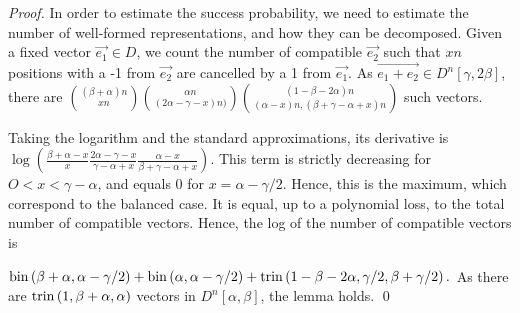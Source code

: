 \begin{proof}
In order to estimate the success probability, we need to estimate the number of well-formed representations, and how they can be decomposed. Given a fixed vector $\vec{e_1} \in D$, we count the number of compatible $\vec{e_2}$ such that $xn$ positions with a -1 from $\vec{e_2}$ are cancelled by a 1 from $\vec{e_1}$. As $\vec{e_1+e_2} \in D^n[\gamma,2\beta]$, there are
${(\beta+\alpha)n \choose xn} {\alpha n \choose (2\alpha - \gamma -x) n)} { (1-\beta-2\alpha)n \choose (\alpha-x)n, (\beta+\gamma-\alpha+x)n }$ such vectors.

Taking the logarithm and the standard approximations, its derivative is $\log\left(\frac{\beta + \alpha -x}x \frac{2\alpha-\gamma -x}{\gamma-\alpha+x} \frac{\alpha-x}{\beta+\gamma-\alpha+x}\right)$. This term is strictly decreasing for $O< x < \gamma-\alpha$, and equals 0 for $x = \alpha-\gamma/2$. Hence, this is the maximum, which correspond to the balanced case. It is equal, up to a polynomial loss, to the total number of compatible vectors. Hence, the log of the number of compatible vectors is

$\mathrm{bin}\left(\beta+\alpha,\alpha-\gamma/2\right) + \mathrm{bin}\left(\alpha,\alpha-\gamma/2\right) + \mathrm{trin}\left(1-\beta-2\alpha,\gamma/2,\beta+\gamma/2\right).$
As there are $\mathrm{trin}\left(1,\beta+\alpha,\alpha\right)$ vectors in $D^n[\alpha,\beta]$, the lemma holds. \qed
\end{proof}


